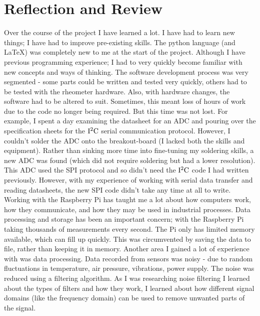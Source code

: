 \documentclass[twoside,a4]{report}
\def\shorttitle{Development of a Rheometer Controller}
\def\br{\newline \newline \noindent}
\def\achapter{\shorttitle}  %
\def\nc#1{
	\addtocounter{chapter}{1} 
	\def\achapter{\arabic{chapter} #1}
	\chapter*{\arabic{chapter} #1} 
	\addcontentsline{toc}{chapter}{\achapter} 
}
\begin{document}
	
	\nc{Reflection and Review}
	Over the course of the project I have learned a lot. I have had to learn new things; I have had to improve pre-existing skills. The python language (and \LaTeX) was completely new to me at the start of the project. Although I have previous programming experience; I had to very quickly become familiar with new concepts and ways of thinking. The software development process was very segmented - some parts could be written and tested very quickly, others had to be tested with the rheometer hardware. Also, with hardware changes, the software had to be altered to suit. Sometimes, this meant loss of hours of work due to the code no longer being required. But this time was not lost. For example, I spent a day examining the datasheet for an ADC and pouring over the specification sheets for the $\rm I^2C$ serial communication protocol. However, I couldn't solder the ADC onto the breakout-board (I lacked both the skills and equipment). Rather than sinking more time into fine-tuning my soldering skills, a new ADC was found (which did not require soldering but had a lower resolution). This ADC used the SPI protocol and so didn't need the $\rm I^2C$ code I had written previously. However, with my experience of working with serial data transfer and reading datasheets, the new SPI code didn't take any time at all to write.
	\br
	Working with the Raspberry Pi has taught me a lot about how computers work, how they communicate, and how they may be used in industrial processes. Data processing and storage has been an important concern; with the Raspberry Pi taking thousands of measurements every second. The Pi only has limited memory available, which can fill up quickly. This was circumvented by saving the data to file, rather than keeping it in memory. 
	\br
	Another area I gained a lot of experience with was data processing. Data recorded from sensors was noisy - due to random fluctuations in temperature, air pressure, vibrations, power supply. The noise was reduced using a filtering algorithm. As I was researching noise filtering I learned about the types of filters and how they work, I learned about how different signal domains (like the frequency domain) can be used to remove unwanted parts of the signal.
	\br
\end{document}
